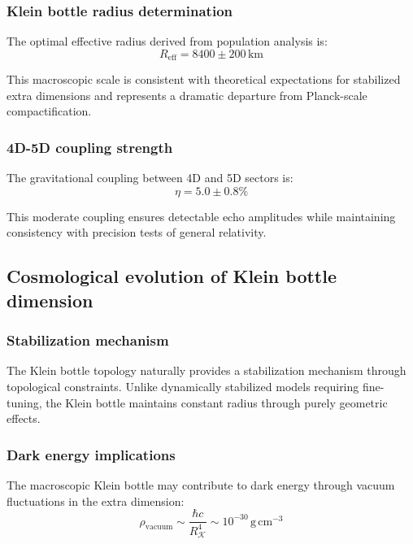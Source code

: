 \documentclass[12pt]{iopart}
\newcommand{\Reff}{R_{\mathrm{eff}}}
\newcommand{\km}{\,\mathrm{km}}
\newcommand{\Klein}{\mathcal{K}}
\begin{document}
\subsubsection{Klein bottle radius determination}

The optimal effective radius derived from population analysis is:
\begin{equation}
\Reff = 8400 \pm 200\km
\label{eq:optimal_radius}
\end{equation}

This macroscopic scale is consistent with theoretical expectations for stabilized extra dimensions and represents a dramatic departure from Planck-scale compactification.

\subsubsection{4D-5D coupling strength}

The gravitational coupling between 4D and 5D sectors is:
\begin{equation}
\eta = 5.0 \pm 0.8\%
\label{eq:coupling_strength}
\end{equation}

This moderate coupling ensures detectable echo amplitudes while maintaining consistency with precision tests of general relativity.

\subsection{Cosmological evolution of Klein bottle dimension}

\subsubsection{Stabilization mechanism}

The Klein bottle topology naturally provides a stabilization mechanism through topological constraints. Unlike dynamically stabilized models requiring fine-tuning, the Klein bottle maintains constant radius through purely geometric effects.

\subsubsection{Dark energy implications}

The macroscopic Klein bottle may contribute to dark energy through vacuum fluctuations in the extra dimension:
\begin{equation}
\rho_{\mathrm{vacuum}} \sim \frac{\hbar c}{R_{\Klein}^4} \sim 10^{-30}\,\mathrm{g\,cm^{-3}}
\label{eq:vacuum_energy}
\end{equation}
\end{document}
